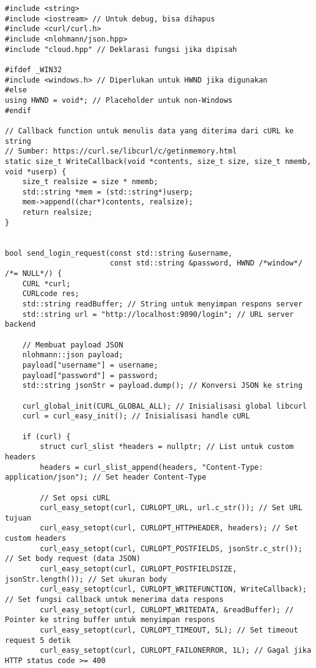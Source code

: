 \begin{verbatim}
#include <string>
#include <iostream> // Untuk debug, bisa dihapus
#include <curl/curl.h>
#include <nlohmann/json.hpp>
#include "cloud.hpp" // Deklarasi fungsi jika dipisah

#ifdef _WIN32
#include <windows.h> // Diperlukan untuk HWND jika digunakan
#else
using HWND = void*; // Placeholder untuk non-Windows
#endif

// Callback function untuk menulis data yang diterima dari cURL ke string
// Sumber: https://curl.se/libcurl/c/getinmemory.html
static size_t WriteCallback(void *contents, size_t size, size_t nmemb, void *userp) {
    size_t realsize = size * nmemb;
    std::string *mem = (std::string*)userp;
    mem->append((char*)contents, realsize);
    return realsize;
}


bool send_login_request(const std::string &username,
                        const std::string &password, HWND /*window*/ /*= NULL*/) {
    CURL *curl;
    CURLcode res;
    std::string readBuffer; // String untuk menyimpan respons server
    std::string url = "http://localhost:9090/login"; // URL server backend

    // Membuat payload JSON
    nlohmann::json payload;
    payload["username"] = username;
    payload["password"] = password;
    std::string jsonStr = payload.dump(); // Konversi JSON ke string

    curl_global_init(CURL_GLOBAL_ALL); // Inisialisasi global libcurl
    curl = curl_easy_init(); // Inisialisasi handle cURL

    if (curl) {
        struct curl_slist *headers = nullptr; // List untuk custom headers
        headers = curl_slist_append(headers, "Content-Type: application/json"); // Set header Content-Type

        // Set opsi cURL
        curl_easy_setopt(curl, CURLOPT_URL, url.c_str()); // Set URL tujuan
        curl_easy_setopt(curl, CURLOPT_HTTPHEADER, headers); // Set custom headers
        curl_easy_setopt(curl, CURLOPT_POSTFIELDS, jsonStr.c_str()); // Set body request (data JSON)
        curl_easy_setopt(curl, CURLOPT_POSTFIELDSIZE, jsonStr.length()); // Set ukuran body
        curl_easy_setopt(curl, CURLOPT_WRITEFUNCTION, WriteCallback); // Set fungsi callback untuk menerima data respons
        curl_easy_setopt(curl, CURLOPT_WRITEDATA, &readBuffer); // Pointer ke string buffer untuk menyimpan respons
        curl_easy_setopt(curl, CURLOPT_TIMEOUT, 5L); // Set timeout request 5 detik
        curl_easy_setopt(curl, CURLOPT_FAILONERROR, 1L); // Gagal jika HTTP status code >= 400


\end{verbatim}
